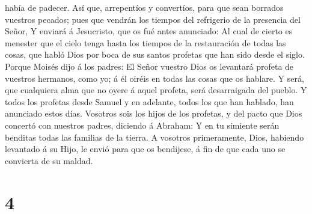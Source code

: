 había de padecer.  Así que, arrepentíos y convertíos, para
que sean borrados vuestros pecados; pues que vendrán los tiempos del
refrigerio de la presencia del Señor,  Y enviará á
Jesucristo, que os fué antes anunciado:  Al cual de cierto
es menester que el cielo tenga hasta los tiempos de la restauración de
todas las cosas, que habló Dios por boca de sus santos profetas que han
sido desde el siglo.  Porque Moisés dijo á los padres: El
Señor vuestro Dios os levantará profeta de vuestros hermanos, como yo; á
él oiréis en todas las cosas que os hablare.  Y será, que
cualquiera alma que no oyere á aquel profeta, será desarraigada del
pueblo.  Y todos los profetas desde Samuel y en adelante,
todos los que han hablado, han anunciado estos días. 
Vosotros sois los hijos de los profetas, y del pacto que Dios concertó
con nuestros padres, diciendo á Abraham: Y en tu simiente serán benditas
todas las familias de la tierra.  A vosotros primeramente,
Dios, habiendo levantado á su Hijo, le envió para que os bendijese, á
fin de que cada uno se convierta de su maldad.

\hypertarget{section-3}{%
\section{4}\label{section-3}}

